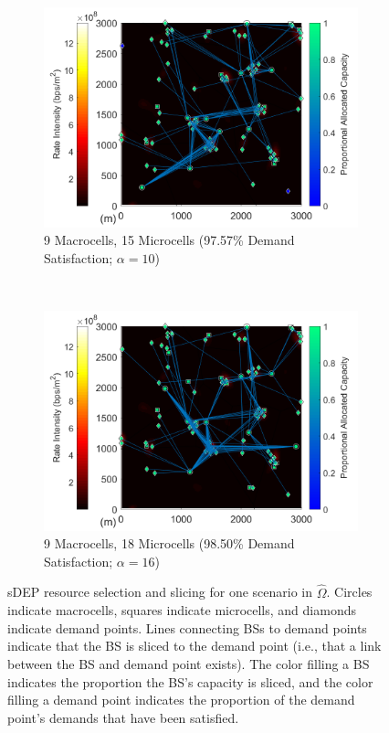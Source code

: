 \documentclass[12pt,dvipsnames]{report}
\begin{document}
\begin{figure}[p]
	\centering
	\begin{subfigure}{.7\textwidth}
		\centering
		\includegraphics[width=1\linewidth]{Figures/CaseII_VoronoiDemandAllocation_sDEP_9-15}
		\caption{\small 9 Macrocells, 15 Microcells (97.57\% Demand Satisfaction; $\alpha = 10$)}
		\label{fig:CaseII_VoronoiDemandAllocation_sDEP_9-15}
	\end{subfigure} \\
	\begin{subfigure}{.7\textwidth}
		\centering
		\includegraphics[width=1\linewidth]{Figures/CaseII_VoronoiDemandAllocation_sDEP_9-18}
		\caption{\small 9 Macrocells, 18 Microcells (98.50\% Demand Satisfaction; $\alpha = 16$)}
		\label{fig:CaseII_VoronoiDemandAllocation_sDEP_9-18}
	\end{subfigure}
	\caption[One sDEP resource selection and slicing solution for Case II]{sDEP resource selection and slicing for one scenario in $\hat{\Omega}$.  Circles indicate macrocells, squares indicate microcells, and diamonds indicate demand points.  Lines connecting BSs to demand points indicate that the BS is sliced to the demand point (i.e., that a link between the BS and demand point exists).  The color filling a BS indicates the proportion the BS's capacity is sliced, and the color filling a demand point indicates the proportion of the demand point's demands that have been satisfied.}
	\label{fig:CaseII_VoronoiDemandAllocation_sDEP}
\end{figure}
\end{document}
